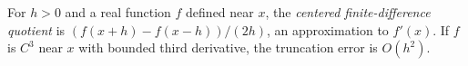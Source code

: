 
For $h>0$ and a real function $f$ defined near $x$, the \emph{centered finite-difference quotient} is $(f(x+h)-f(x-h))/(2h)$, an approximation to $f'(x)$. If $f$ is $C^3$ near $x$ with bounded third derivative, the truncation error is $O(h^2)$.
